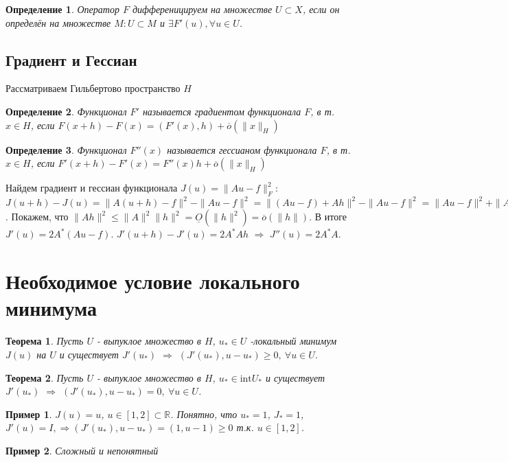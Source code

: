 \documentclass[9pt, a4paper]{extarticle}
\newtheorem*{theorem*}{Теорема}
\newtheorem*{definition}{Определение}
\newtheorem*{sample}{Пример}
\begin{document}
	\begin{definition}
			Оператор $F$ дифференицируем на множестве $U \subset X$, если он определён на множестве $M: U \subset M$ и $\exists F'(u), \forall u \in U$. 
	\end{definition}
	\subsection*{Градиент и Гессиан}
	Рассматриваем Гильбертово пространство $H$
	\begin{definition}
		Функционал $F'$ называется градиентом функционала $F$, в т. $x \in H$, если $F(x + h) - F(x) = (F'(x), h) + \overline{o}(\|x\|_H)$
	\end{definition}
	\begin{definition}
		Функционал $F''(x)$ называется гессианом функционала $F$, в т. $x \in H$, если $F'(x + h) - F'(x) = F''(x)h + \overline{o}(\|x\|_H)$
	\end{definition}
	Найдем градиент и гессиан функционала $J(u) = \|Au - f\|_F^2$: \newline
	$J(u+h) - J(u) = \|A(u+h) - f\|^2 - \|Au - f\|^2 = \|(Au - f) + Ah\|^2 - \|Au - f\|^2 = \|Au - f\|^2 + \|Ah\|^2 + 2 (Au - f, Ah) - \|Au -f\|^2 = (Au - f, Ah) + \|Ah\|^2$. Покажем, что  $\|Ah\|^2 \leq \|A\|^2 \|h\|^2 = \underline{O}(\|h\|^2) = \overline{o}(\|h\|)$. \newline
	В итоге $J'(u) = 2 A^*(Au - f)$.\newline
	$J'(u+h) - J'(u) = 2A^*A h$ $\Rightarrow$ $J''(u) = 2A^*A$.
	
\section{Необходимое условие локального минимума}
	\begin{theorem*}
		Пусть $U$ - выпуклое множество в $H$, $u_* \in U$ -локальный минимум $J(u)$ на $U$ и существует $J'(u_*)$ $\Rightarrow$ $(J'(u_*), u - u_*) \geq 0, \ \forall u \in U$. 
	\end{theorem*}
	\begin{theorem*}
		Пусть $U$ - выпуклое множество в $H$, $u_* \in \text{int}U_*$ и  существует $J'(u_*)$ $\Rightarrow$ $(J'(u_*), u - u_*) = 0, \ \forall u \in U$. 
	\end{theorem*}
	\begin{sample}
		$J(u) = u$, $u \in [1,2] \subset \mathbb{R}$. Понятно, что $u_* = 1$, $J_* = 1$, $J'(u) = I, \Rightarrow (J'(u_*), u- u_*) = (1, u - 1) \geq 0$ т.к. $u \in [1,2]$.
	\end{sample}
	\begin{sample}
		Сложный и непонятный
		
	\end{sample}
\end{document}
